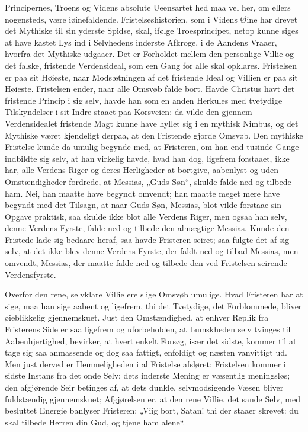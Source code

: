 \documentclass[12pt]{book}
\begin{document}
Principernes, Troens og Videns absolute Ueensartet\-
hed maa vel her, om ellers nogensteds, være iøinefaldende.
Fristelseshistorien, som i Videns Øine har drevet det Mythiske til
sin yderste Spidse, skal, ifølge Troesprincipet, netop kunne siges
at have kastet Lys ind i Selvhedens inderste Afkroge, i de Aandens
Vraaer, hvorfra det Mythiske udgaaer. Det er Forholdet mellem den
personlige Villie og det falske, fristende Verdensideal, som een
Gang for alle skal opklares. Fristelsen er paa sit Høieste, naar
Modsætningen af det fristende Ideal og Villien er paa sit Høieste.
Fristelsen ender, naar alle Omsvøb falde bort. Havde Christus havt
det fristende Princip i sig selv, havde han som en anden Herkules
med tvetydige Tilskyndelser i sit Indre staaet paa Korsveien: da
vilde den gjennem Verdensidealet fristende Magt kunne have hyllet
sig i en mythisk Nimbus, og det Mythiske været kjendeligt derpaa, at
den Fristende gjorde Omsvøb. Den mythiske Fristelse kunde da umulig
begynde med, at Fristeren, om han end tusinde Gange indbildte sig
selv, at han virkelig havde, hvad han dog, ligefrem forstaaet, ikke
har, alle Verdens Riger og deres Herligheder at bortgive, aabenlyst
og uden Omstændigheder fordrede, at Messias, „Guds Søn“, skulde
falde ned og tilbede ham. Nei, han maatte have begyndt omvendt; han
maatte meget mere have begyndt med det Tilsagn, at naar Guds Søn,
Messias, blot vilde forstaae sin Opgave praktisk, saa skulde ikke
blot alle Verdens Riger, men ogsaa han selv, denne Verdens Fyrste,
falde ned og tilbede den almægtige Messias. Kunde den Fristede lade
sig bedaare heraf, saa havde Fristeren seiret; saa fulgte det af sig
selv, at det ikke blev denne Verdens Fyrste, der faldt ned og tilbad
Messias, men omvendt, Messias, der maatte falde ned og tilbede den
ved Fristelsen seirende Verdensfyrste.

Overfor den rene, selvklare Villie ere slige Omsvøb umulige. Hvad
Fristeren har at sige, maa han sige
aabent og ligefrem, thi det Tvetydige, det Forblommede, bliver
øieblikkelig gjennemskuet. Just den Omstændighed, at enhver Replik
fra Fristerens Side er saa ligefrem og uforbeholden, at Lumskheden
selv tvinges til Aabenhjertighed, bevirker, at hvert enkelt Forsøg,
især det sidste, kommer til at tage sig saa anmassende og dog saa
fattigt, enfoldigt og næsten vanvittigt ud. Men just derved er
Hemmeligheden i al Fristelse afsløret: Fristelsen kommer i sidste
Instans fra det onde Selv; dets inderste Mening er væsentlig
meningsløs; den afgjørende Seir betinges af, at dets dunkle,
selvmodsigende Væsen bliver fuldstændig gjennemskuet; Afgjørelsen
er, at den rene Villie, det sande Selv, med besluttet Energie
banlyser Fristeren: „Viig bort, Satan! thi der staaer skrevet: du
skal tilbede Herren din Gud, og tjene ham alene“.
\end{document}
